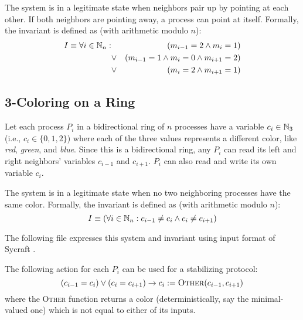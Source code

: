 The system is in a legitimate state when neighbors pair up by pointing at each other.
If both neighbors are pointing away, a process can point at itself.
Formally, the invariant is defined as (with arithmetic modulo $n$):
\begin{eqnarray*}
 I \equiv \forall i\in\mathbb{N}_n: & & (m_{i-1} = 2 \wedge m_i = 1)
                    \\ & \vee  & (m_{i-1} = 1 \wedge m_i = 0 \wedge m_{i+1} = 2)
                    \\ & \vee  & (m_i = 2 \wedge m_{i+1} = 1)
\end{eqnarray*}

\subsection{3-Coloring on a Ring}

Let each process $P_i$ in a bidirectional ring of $n$ processes have a variable $c_i\in \mathbb{N}_3$ (i.e., $c_i\in \{0,1,2\}$) where each of the three values represents a different color, like {\it red}, {\it green}, and {\it blue}.
Since this is a bidirectional ring, any $P_i$ can read its left and right neighbors' variables $c_{i-1}$ and $c_{i+1}$.
$P_i$ can also read and write its own variable $c_i$.

The system is in a legitimate state when no two neighboring processes have the same color.
Formally, the invariant is defined as (with arithmetic modulo $n$):
\[ I \equiv (\forall i\in\mathbb{N}_n: c_{i-1}\ne c_i \wedge c_i \ne c_{i+1}) \]

The following file expresses this system and invariant using input format of Sycraft \cite{sycraft2008}.

\fbox{
 
}

The following action for each $P_i$ can be used for a stabilizing protocol:
\[
 (c_{i-1} = c_i) \vee (c_i = c_{i+1}) \to c_i := \textsc{Other}(c_{i-1}, c_{i+1})
\]
where the \textsc{Other} function returns a color (deterministically, say the minimal-valued one) which is not equal to either of its inputs.

